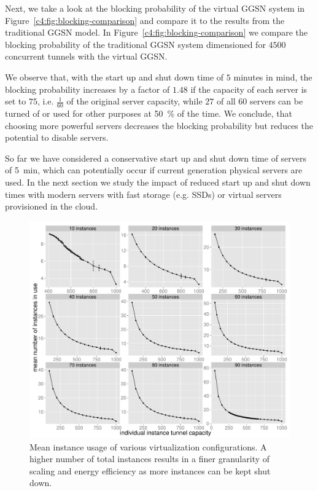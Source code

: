 Next, we take a look at the blocking probability of the virtual \gls{GGSN} system in Figure~\ref{c4:fig:blocking-comparison} and compare it to the results from the traditional \gls{GGSN} model. In Figure~\ref{c4:fig:blocking-comparison} we compare the blocking probability of the traditional \gls{GGSN} system dimensioned for $4500$ concurrent tunnels with the virtual \gls{GGSN}.

We observe that, with the start up and shut down time of $5$ minutes in mind, the blocking probability increases by a factor of $1.48$ if the capacity of each server is set to $75$, i.e. $\frac{1}{60}$ of the original server capacity, while $27$ of all $60$ servers can be turned of or used for other purposes at \SI{50}{\percent} of the time. We conclude, that choosing more powerful servers decreases the blocking probability but reduces the potential to disable servers.

So far we have considered a conservative start up and shut down time of servers of \SI{5}{\minute}, which can potentially occur if current generation physical servers are used.
In the next section we study the impact of reduced start up and shut down times with modern servers with fast storage (e.g. \glspl{SSD}) or virtual servers provisioned in the cloud.



\begin{figure}[htb]
  \centering
  \includegraphics[width=1.0\textwidth]{images/R-virtualized-mean-instanceusage.pdf}
  \caption{Mean instance usage of various virtualization configurations. A higher number of total instances results in a finer granularity of scaling and energy efficiency as more instances can be kept shut down.}
 \label{c4:fig:res-instance-usage-mean}
\end{figure}



